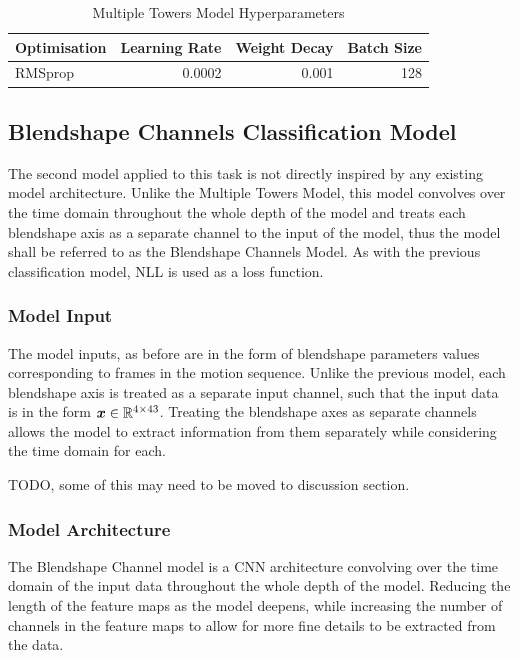 \begin{table}[h!]
\centering
    \begin{tabular}{l | r | r | r}
    \textbf{Optimisation} & \textbf{Learning Rate} & \textbf{Weight Decay} & \textbf{Batch Size} \\ \hline
    RMSprop & 0.0002 & 0.001 & 128 \\
    \end{tabular} 
    \caption{Multiple Towers Model Hyperparameters}\label{table:multi_towers_classifier_hyperparameters}
\end{table}


\subsection{Blendshape Channels Classification Model}\label{secc:blendshape_channels_model}
The second model applied to this task is not directly inspired by any existing model architecture.
Unlike the Multiple Towers Model, this model convolves over the time domain throughout the whole depth of the model and treats each blendshape axis as a separate channel to the input of the model, thus the model shall be referred to as the Blendshape Channels Model.
As with the previous classification model, NLL is used as a loss function.

\subsubsection{Model Input}
The model inputs, as before are in the form of blendshape parameters values corresponding to frames in the motion sequence.
Unlike the previous model, each blendshape axis is treated as a separate input channel, such that the input data is in the form ${\boldsymbol{{x}}} \in \mathbb{R}^{4 \times 43}$.
Treating the blendshape axes as separate channels allows the model to extract information from them separately while considering the time domain for each.

TODO, some of this may need to be moved to discussion section.

\subsubsection{Model Architecture}
The Blendshape Channel model is a CNN architecture convolving over the time domain of the input data throughout the whole depth of the model.
Reducing the length of the feature maps as the model deepens, while increasing the number of channels in the feature maps to allow for more fine details to be extracted from the data.

